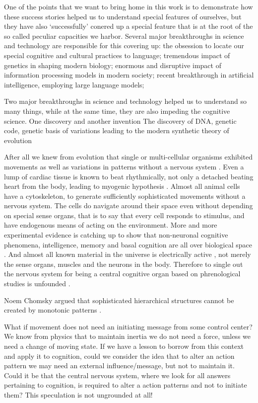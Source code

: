 One of the points that we want to bring home in this work is to demonstrate how these success stories helped us to understand special features of ourselves, but they have also `successfully' conered up a special feature that is at the root of the so called peculiar capacities we harbor.  
Several major breakthroughs in science and technology are responsible for this covering up: the obsession to locate our special cognitive and cultural practices to language; tremendous impact of genetics in shaping modern biology; enormous and disruptive impact of information processing models in modern society; recent breakthrough in artificial intelligence, employing large language models; 

Two major breakthroughs in science and technology helped us to understand so many things, while at the same time, they are also impeding the cognitive science. One discovery and another invention 
The discovery of DNA, genetic code, genetic basis of variations leading to the modern synthetic theory of evolution 

After all we knew from evolution that single or multi-cellular organisms exhibited movements as well as variations in patterns without a nervous system \citep{llinas2002vortex}. Even a lump of cardiac tissue is known to beat rhythmically, not only a detached beating heart from the body, leading to myogenic hypothesis  \citep{landecker2007culturing}.  Almost all animal cells have a cytoskeleton, to generate sufficiently sophisticated movements without a nervous system.  The cells do navigate around their space even without depending on special sense organs, that is to say that every cell responds to stimulus, and have endogenous means of acting on the environment.  More and more experimental evidence is catching up to show that non-neuronal cognitive phenomena, intelligence, memory and basal cognition are all over biological space \citep{Levin2023, biomimetics-Levin2023}. And almost all known material in the universe is electrically active \citep{Peratt1996plasma}, not merely the sense organs, muscles and the neurons in the body. Therefore to single out the nervous system for being a central cognitive organ based on phrenological studies is unfounded \citep{anderson2014phrenology}.    

Noem Chomsky argued that sophisticated hierarchical structures cannot be created by monotonic patterns \citep{chomsky1957syntactic}. 

What if movement does not need an initiating message from some control center? We know from physics that to maintain inertia we do not need a force, unless we need a change of moving state. If we have a lesson to borrow from this context and apply it to cognition, could we consider the idea that to alter an action pattern we may need an external influence/message, but not to maintain it. Could it be that the central nervous system, where we look for all answers pertaining to cognition, is required to alter a action patterns and not to initiate them? This speculation is not ungrounded at all! 


